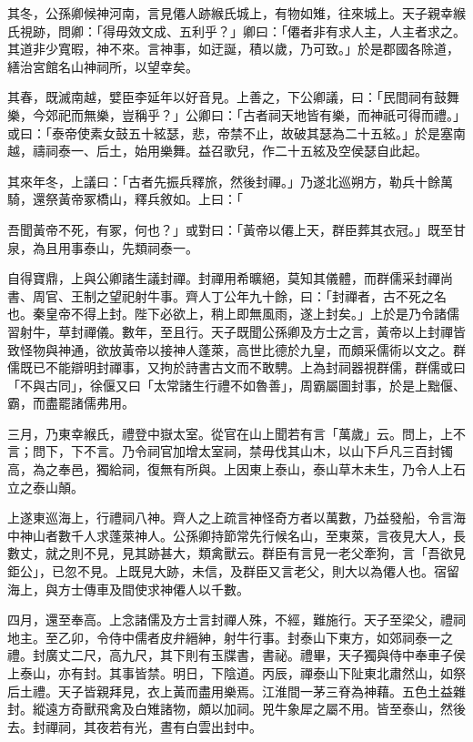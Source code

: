 \begin{pinyinscope}
其冬，公孫卿候神河南，言見僊人跡緱氏城上，有物如雉，往來城上。天子親幸緱氏視跡，問卿：「得毋效文成、五利乎？」卿曰：「僊者非有求人主，人主者求之。其道非少寬暇，神不來。言神事，如迂誕，積以歲，乃可致。」於是郡國各除道，繕治宮館名山神祠所，以望幸矣。

其春，既滅南越，嬖臣李延年以好音見。上善之，下公卿議，曰：「民間祠有鼓舞樂，今郊祀而無樂，豈稱乎？」公卿曰：「古者祠天地皆有樂，而神祇可得而禮。」或曰：「泰帝使素女鼓五十絃瑟，悲，帝禁不止，故破其瑟為二十五絃。」於是塞南越，禱祠泰一、后土，始用樂舞。益召歌兒，作二十五絃及空侯瑟自此起。

其來年冬，上議曰：「古者先振兵釋旅，然後封禪。」乃遂北巡朔方，勒兵十餘萬騎，還祭黃帝冢橋山，釋兵敘如。上曰：「

吾聞黃帝不死，有冢，何也？」或對曰：「黃帝以僊上天，群臣葬其衣冠。」既至甘泉，為且用事泰山，先類祠泰一。

自得寶鼎，上與公卿諸生議封禪。封禪用希曠絕，莫知其儀體，而群儒采封禪尚書、周官、王制之望祀射牛事。齊人丁公年九十餘，曰：「封禪者，古不死之名也。秦皇帝不得上封。陛下必欲上，稍上即無風雨，遂上封矣。」上於是乃令諸儒習射牛，草封禪儀。數年，至且行。天子既聞公孫卿及方士之言，黃帝以上封禪皆致怪物與神通，欲放黃帝以接神人蓬萊，高世比德於九皇，而頗采儒術以文之。群儒既已不能辯明封禪事，又拘於詩書古文而不敢騁。上為封祠器視群儒，群儒或曰「不與古同」，徐偃又曰「太常諸生行禮不如魯善」，周霸屬圖封事，於是上黜偃、霸，而盡罷諸儒弗用。

三月，乃東幸緱氏，禮登中嶽太室。從官在山上聞若有言「萬歲」云。問上，上不言；問下，下不言。乃令祠官加增太室祠，禁毋伐其山木，以山下戶凡三百封镯高，為之奉邑，獨給祠，復無有所與。上因東上泰山，泰山草木未生，乃令人上石立之泰山顛。

上遂東巡海上，行禮祠八神。齊人之上疏言神怪奇方者以萬數，乃益發船，令言海中神山者數千人求蓬萊神人。公孫卿持節常先行候名山，至東萊，言夜見大人，長數丈，就之則不見，見其跡甚大，類禽獸云。群臣有言見一老父牽狗，言「吾欲見鉅公」，已忽不見。上既見大跡，未信，及群臣又言老父，則大以為僊人也。宿留海上，與方士傳車及間使求神僊人以千數。

四月，還至奉高。上念諸儒及方士言封禪人殊，不經，難施行。天子至梁父，禮祠地主。至乙卯，令侍中儒者皮弁縉紳，射牛行事。封泰山下東方，如郊祠泰一之禮。封廣丈二尺，高九尺，其下則有玉牒書，書祕。禮畢，天子獨與侍中奉車子侯上泰山，亦有封。其事皆禁。明日，下陰道。丙辰，禪泰山下阯東北肅然山，如祭后土禮。天子皆親拜見，衣上黃而盡用樂焉。江淮間一茅三脊為神藉。五色土益雜封。縱遠方奇獸飛禽及白雉諸物，頗以加祠。兕牛象犀之屬不用。皆至泰山，然後去。封禪祠，其夜若有光，晝有白雲出封中。


\end{pinyinscope}
